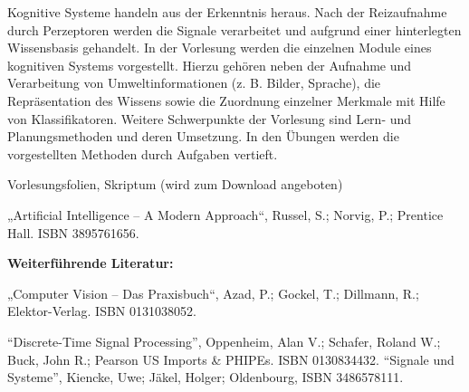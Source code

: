 \begin{course}
\begin{content}
Kognitive Systeme handeln aus der Erkenntnis heraus. Nach der Reizaufnahme durch Perzeptoren werden die Signale verarbeitet und aufgrund einer hinterlegten Wissensbasis gehandelt. In der Vorlesung werden die einzelnen Module eines kognitiven Systems vorgestellt. Hierzu gehören neben der Aufnahme und Verarbeitung von Umweltinformationen (z. B. Bilder, Sprache), die Repräsentation des Wissens sowie die Zuordnung einzelner Merkmale mit Hilfe von Klassifikatoren. Weitere Schwerpunkte der Vorlesung sind Lern- und Planungsmethoden und deren Umsetzung. In den Übungen werden die vorgestellten Methoden durch Aufgaben vertieft.


\end{content}

\begin{media}Vorlesungsfolien, Skriptum (wird zum Download angeboten)

\end{media}

\begin{literature}„Artificial Intelligence – A Modern Approach“, Russel, S.; Norvig, P.; Prentice Hall. ISBN 3895761656.

 

\textbf{Weiterführende Literatur:}

 

„Computer Vision – Das Praxisbuch“, Azad, P.; Gockel, T.; Dillmann, R.; Elektor-Verlag. ISBN 0131038052.

 

“Discrete-Time Signal Processing”, Oppenheim, Alan V.; Schafer, Roland W.; Buck, John R.; Pearson US Imports \& PHIPEs. ISBN 0130834432.\newline
“Signale und Systeme”, Kiencke, Uwe; Jäkel, Holger; Oldenbourg, ISBN 3486578111.

\end{literature}



\end{course}